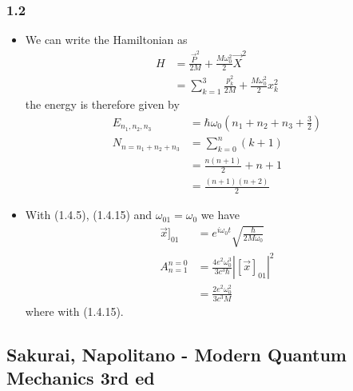 \documentclass[10pt,a4paper]{article}
\theoremstyle{definition}
\begin{document}
\subsubsection{1.2}
\begin{itemize}
\item We can write the Hamiltonian as
\begin{align}
    H&=\frac{\vec{P}^2}{2M}+\frac{M\omega_0^2}{2}\vec{X}^2\\
    &=\sum_{k=1}^3\frac{p_k^2}{2M}+\frac{M\omega_0^2}{2}x_k^2
\end{align}
the energy is therefore given by
\begin{align}
    E_{n_1,n_2,n_3}&=\hbar\omega_0\left(n_1+n_2+n_3+\frac{3}{2}\right)\\
    N_{n=n_1+n_2+n_3}&=\sum_{k=0}^{n}(k+1)\\
    &=\frac{n(n+1)}{2}+n+1\\
    &=\frac{(n+1)(n+2)}{2}
\end{align}

\item With (1.4.5), (1.4.15) and $\omega_{01}=\omega_0$ we have
\begin{align}
    \vec{x}]_{01}&=e^{i\omega_0 t}\sqrt{\frac{\hbar}{2M\omega_0}}\\
    A_{n=1}^{n=0}&=\frac{4e^2\omega_0^3}{3c^3\hbar}\left|[\vec{x}]_{01}\right|^2\\
    &=\frac{2e^2\omega_0^2}{3c^3M}
\end{align}
where with (1.4.15).
\end{itemize}

\subsection{{\sc Sakurai, Napolitano} - Modern Quantum Mechanics 3rd ed}
\end{document}
